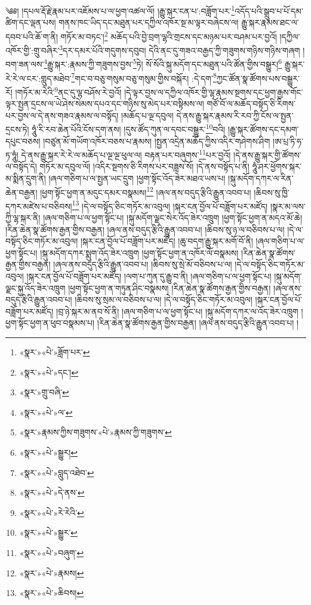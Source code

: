 ༄༅། །དཔལ་རྡོ་རྗེ་རྣམ་པར་འཇོམས་པ་ལ་ཕྱག་འཚལ་ལོ། །རྒྱུ་སྐར་ངན་པ་:བཟློག་པར་\footnote{«སྣར་»«པེ་»ཟློག་པར་}འདོད་པའི་སྒྲུབ་པ་པོ་དམ་ཚིག་དང་ལྡན་པས། གནས་ཁང་ཡིད་དང་མཐུན་པར་དཀྱིལ་འཁོར་སྔ་མ་ལྟར་བཞེངས་ལ། རྒྱུ་སྐར་རྣམས་ཐང་ལ་དབབ་པའི་ཆོ་ག་ནི། གཏོར་མ་བཏང་།\footnote{«སྣར་»«པེ་»དང་།} མཆོད་པའི་བྱེ་བྲག་ལྷའི་གྲངས་དང་མཉམ་པར་བཤམ་པར་བྱའོ། །དཀྱིལ་འཁོར་གྱི་:གྲུ་བཞིར་\footnote{«སྣར་»གྲུ་བཞི་}དར་དམར་པོའི་གདུགས་དབུབ། དེའི་ནང་དུ་གཟའ་བརྒྱད་ཀྱི་གཟུགས་གཉིས་གཉིས་གཞག །བག་ཟན་ལས་\footnote{«སྣར་»«པེ་»ལ་}རྒྱུ་སྐར་:རྣམས་ཀྱི་གཟུགས་བྱས་\footnote{«སྣར་»རྣམས་ཀྱིས་གཟུགས་«པེ་»རྣམས་ཀྱི་གཟུགས་}ཏེ། སོ་སོའི་སྐུ་མདོག་དང་མཐུན་པའི་ཚོན་གྱིས་བསྒྱུར།\footnote{«སྣར་»«པེ་»སྒྱུར།} རྒྱུ་སྐར་རེ་རེ་ལ་ངར་:གླུད་མཐེབ་\footnote{«སྣར་»«པེ་»བླུད་འཐེབ་}གང་བ་བཅུ་གསུམ་བཅུ་གསུམ་གྱིས་བསྐོར། :དེ་དག་\footnote{«སྣར་»«པེ་»དེ་ནས་}ཀྱང་ཚོན་སྣ་ཚོགས་པས་བསྒྱུར་རོ། །གཏོར་མ་རེའི་\footnote{«སྣར་»«པེ་»རེ་རེའི་}ནང་དུ་ལྷ་བཤོས་རེ་བྱའོ། །དེ་ལྟར་བྱས་ལ་དཀྱིལ་འཁོར་གྱི་ལྷ་རྣམས་སྔགས་དང་ཕྱག་རྒྱས་གོང་ལྟར་སྤྱན་དྲངས་ལ་ཡེ་ཤེས་སེམས་དཔའ་དང་གཉིས་སུ་མེད་པར་བསྟིམས་ལ། གཙོ་བོ་ལ་མཆོད་བསྟོད་ཅི་རིགས་པར་བྱས་ལ་དེ་ནས་གཟའ་རྣམས་ལ་བསྟོད། །མཆོད་པ་ལྔ་དབུལ། དེ་ནས་རྒྱུ་སྐར་རྣམས་རི་རབ་ཀྱི་ངོས་ལ་སྤྱན་དྲངས་ཏེ། ཧཱུཾ་རི་རབ་ཆེན་པོའི་ངོས་དག་ནས། །དུས་ཚོད་ཀུན་ལ་དབང་བསྒྱུར་\footnote{«སྣར་»«པེ་»སྒྱུར་}བའི། །རྒྱུ་སྐར་ཚོགས་དང་དམག་དཔུང་བཅས། །བཙུན་མོ་གཡོག་འཁོར་བཅས་པ་རྣམས། །སྤྱན་འདྲེན་མཆོད་ཀྱིས་འདིར་གཤེགས་ཤིག །ཨ་པྲ་ཏི་ཧ་ཏ་ཧཱུཾ། དེ་ནས་རྒྱུ་སྐར་རེ་རེ་ལ་མཆོད་པ་ལྔ་ལྔ་ཕུལ་ལ། བརྟན་པར་བཞུགས་\footnote{«སྣར་»«པེ་»བཞུག་}པར་བྱའོ། །དེ་ནས་རྒྱུ་སྐར་གྱི་ཚོགས་ལ་བསྟོད་དེ། གཏོར་མ་དབུལ་ལོ། །འདིར་སྔགས་ཅི་རིགས་པར་བཟླས་སོ། །དེ་ནས་བསྟོད་པ་ནི། ཧཱུཾ་ཤར་ཕྱོགས་སྐར་མ་སྨིན་དྲུག་ནི། །ཞལ་གཅིག་པ་ལ་སྤྱན་ཡང་དྲུག །ཕྱག་སྟོང་འོད་ཟེར་མཐའ་ཡས་པ། །སྐུ་མདོག་དཀར་ལ་རིན་ཆེན་བརྒྱན། །ཕྱག་སྟོང་ཕྱག་ན་མདུང་དམར་བསྣམས།\footnote{«སྣར་»«པེ་»རྣམས།} །ཞལ་ནས་བདུད་རྩིའི་རྒྱུན་འབབ་པ། །ཆིབས་སུ་ཁྱི་དཀར་མཛེས་པ་བཅིབས།\footnote{«སྣར་»«པེ་»ཆིབས།} །དེ་ལ་བསྟོད་ཅིང་གཏོར་མ་འབུལ། །སྐར་ངན་བྱོལ་པོ་བཟློག་པར་མཛོད། །སྣར་མ་ལས་ཀྱི་ལྷ་སྐར་ནི། །ཞལ་གཅིག་པ་ལ་ཕྱག་སྟོང་པ། །སྐུ་མདོག་ལྗང་སེར་འོད་ཟེར་འཁྲུག །ཕྱག་སྟོང་ཕྱག་ན་མདའ་མོ་ཆེ། །རིན་ཆེན་སྣ་ཚོགས་རྒྱན་གྱིས་བརྒྱན། །ཞལ་ནས་བདུད་རྩིའི་རྒྱུན་འབབ་པ། །ཆིབས་སུ་ཉ་ལ་བཅིབས་པ་ལ། །དེ་ལ་བསྟོད་ཅིང་གཏོར་མ་འབུལ། །སྐར་ངན་བྱོལ་པོ་བཟློག་པར་མཛོད། །ཆུ་བདག་རྒྱུ་སྐར་མགོ་བོ་ནི། །ཞལ་གཅིག་པ་ལ་ཕྱག་སྟོང་པ། །སྐུ་མདོག་དཀར་སྨུག་འོད་ཟེར་འཁྲུག །ཕྱག་སྟོང་ཕྱག་ན་འཁོར་ལོ་བསྣམས། །རིན་ཆེན་སྣ་ཚོགས་རྒྱན་གྱིས་བརྒྱན། །ཞལ་ནས་བདུད་རྩིའི་རྒྱུན་འབབ་པ། །ཆིབས་སུ་སྲེ་མོ་བཅིབས་པ་ལ། །དེ་ལ་བསྟོད་ཅིང་གཏོར་མ་འབུལ། །སྐར་ངན་བྱོལ་པོ་བཟློག་པར་མཛོད། །ལག་པ་ཀུན་དུ་རྒྱུ་བ་ནི། །ཞལ་གཅིག་པ་ལ་ཕྱག་སྟོང་པ། །སྐུ་མདོག་ལྗང་སྐྱ་འོད་ཟེར་འཁྲུག །ཕྱག་སྟོང་ཕྱག་ན་གཏུན་ཤིང་བསྣམས། །རིན་ཆེན་སྣ་ཚོགས་རྒྱན་གྱིས་བརྒྱན། །ཞལ་ནས་བདུད་རྩིའི་རྒྱུན་འབབ་པ། །ཆིབས་སུ་སྲམ་ལ་བཅིབས་པ་ལ། །དེ་ལ་བསྟོད་ཅིང་གཏོར་མ་འབུལ། །སྐར་ངན་བྱོལ་པོ་བཟློག་པར་མཛོད། །བྲ་ཉེ་སྐར་མ་ནབ་སོ་ནི། །ཞལ་གཅིག་པ་ལ་ཕྱག་སྟོང་པ། །སྐུ་མདོག་དཀར་ལ་འོད་ཟེར་འཁྲུག །ཕྱག་སྟོང་ཕྱག་ན་ཕུབ་བསྣམས་པ། །རིན་ཆེན་སྣ་ཚོགས་རྒྱན་གྱིས་བརྒྱན། །ཞལ་ནས་བདུད་རྩིའི་རྒྱུན་འབབ་པ། །
